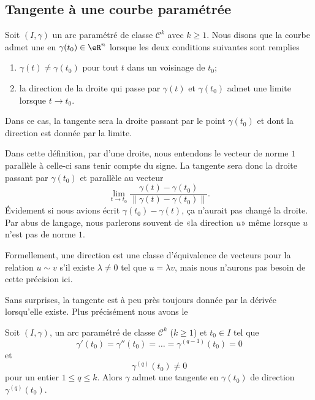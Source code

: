 
\subsection{Tangente à une courbe paramétrée}

\begin{definition}
Soit $(I,\gamma)$ un arc paramétré de classe $\mathcal{C}^k$ avec $k\geq 1$. Nous disons que la courbe admet une  en $\gamma(t_0)\in\eR^n$ lorsque les deux conditions suivantes sont remplies
\begin{enumerate}
    \item
        $\gamma(t)\neq \gamma(t_0)$ pour tout $t$ dans un voisinage de $t_0$;
    \item
        la direction de la droite qui passe par $\gamma(t)$ et $\gamma(t_0)$ admet une limite lorsque $t\to t_0$.
\end{enumerate}
Dans ce cas, la tangente sera la droite passant par le point $\gamma(t_0)$ et dont la direction est donnée par la limite.
\end{definition}
Dans cette définition, par  d'une droite, nous entendons le vecteur de norme $1$ parallèle à celle-ci sans tenir compte du signe. La tangente sera donc la droite passant par $\gamma(t_0)$ et parallèle au vecteur
\begin{equation}
\lim_{t\to t_0}\frac{ \gamma(t)-\gamma(t_0) }{ \| \gamma(t)-\gamma(t_0) \| }. 
\end{equation}
Évidement si nous avions écrit $\gamma(t_0)-\gamma(t)$, ça n'aurait pas changé la droite. Par abus de langage, nous parlerons souvent de «la direction $u$» même lorsque $u$ n'est pas de norme $1$.

Formellement, une direction est une classe d'équivalence de vecteurs pour la relation $u\sim v$ s'il existe $\lambda\neq 0$ tel que $u=\lambda v$, mais nous n'aurons pas besoin de cette précision ici.

Sans surprises, la tangente est à peu près toujours donnée par la dérivée lorsqu'elle existe. Plus précisément nous avons le
\begin{theorem}
Soit $(I,\gamma)$, un arc paramétré de classe $\mathcal{C}^k$ ($k\geq 1$) et $t_0\in I$ tel que
\begin{equation}
    \gamma'(t_0)=\gamma''(t_0)=\ldots=\gamma^{(q-1)}(t_0)=0
\end{equation}
et
\begin{equation}
    \gamma^{(q)}(t_0)\neq 0
\end{equation}
pour un entier $1\leq q\leq k$. Alors $\gamma$ admet une tangente en $\gamma(t_0)$ de direction $\gamma^{(q)}(t_0)$.
\end{theorem}

